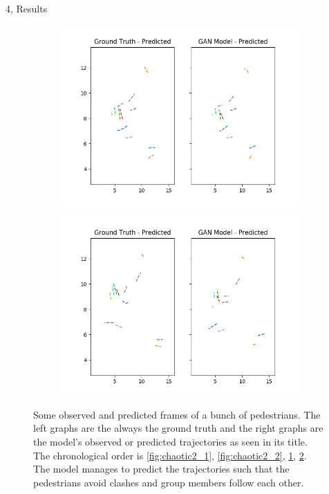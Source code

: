 \documentclass[10pt,a4paper]{article}
\begin{document}
\begin{task}{4, Results}
\begin{itemize}
\begin{figure}[H]
\begin{subfigure}[b]{0.475\textwidth}
\includegraphics[width=\textwidth]{pictures/frames/chaotic_2/frame_14.png}
\caption[]
{{\small }}
\label{fig:chaotic2_3}
\end{subfigure}
\quad
\begin{subfigure}[b]{0.475\textwidth}
\centering
\includegraphics[width=\textwidth]{pictures/frames/chaotic_2/frame_18.png}
\caption[]
{{\small }}
\label{fig:chaotic2_4}
\end{subfigure}
\caption{Some observed and predicted frames of a bunch of pedestrians. The left graphs are the always the ground truth and the right graphs are the model's observed or predicted trajectories as seen in its title. The chronological order is \ref{fig:chaotic2_1}, \ref{fig:chaotic2_2}, \ref{fig:chaotic2_3}, \ref{fig:chaotic2_4}. The model manages to predict the trajectories such that the pedestrians avoid clashes and group members follow each other.}
\label{fig:chaotic2}
\end{figure}


\end{itemize}
\end{task}

\newpage


\end{document}

